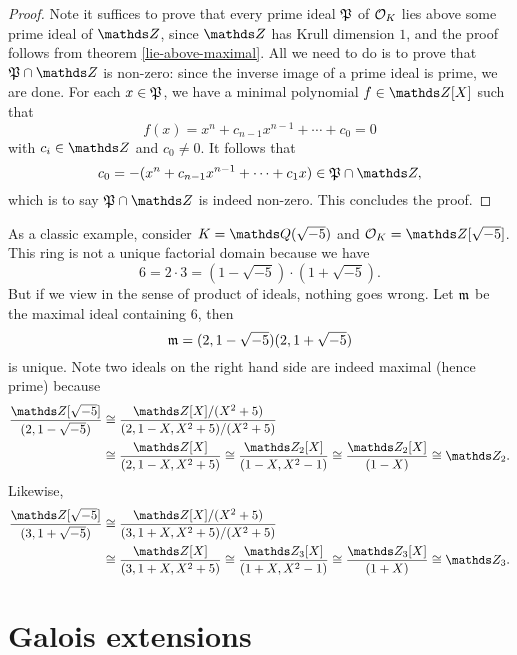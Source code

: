 			\begin{proof}
				Note it suffices to prove that every prime ideal $\mathfrak{P}$ of $\mathcal{O}_K$ lies above some prime ideal of $\Z$, since $\Z$ has Krull dimension $1$, and the proof follows from theorem \ref{lie-above-maximal}. All we need to do is to prove that $\mfk{P} \cap \Z$ is non-zero: since the inverse image of a prime ideal is prime, we are done. For each $x \in \mathfrak{P}$, we have a minimal polynomial $f \in \Z[X]$ such that
				\[
				f(x) = x^n+c_{n-1}x^{n-1}+\cdots+c_0=0
				\]
				with $c_i \in \Z$ and $c_0 \ne 0$. It follows that
				\[
				c_0=-(x^n+c_{n-1}x^{n-1}+\cdots+c_1x) \in \mfk{P} \cap \Z,
				\]
				which is to say $\mfk{P} \cap \Z$ is indeed non-zero. This concludes the proof.
			\end{proof}
			\begin{example}
				As a classic example, consider $K=\Q(\sqrt{-5})$ and $\OK = \Z[\sqrt{-5}]$. This ring is not a unique factorial domain because we have
				\[
				6 = 2 \cdot 3 = (1-\sqrt{-5}) \cdot (1+\sqrt{-5}).
				\]
				But if we view in the sense of product of ideals, nothing goes wrong. Let $\mathfrak{m}$ be the maximal ideal containing $6$, then
				\[
				\mathfrak{m} = (2,1-\sqrt{-5})(2,1+\sqrt{-5})
				\]
				is unique. Note two ideals on the right hand side are indeed maximal (hence prime) because
				\[
				\begin{aligned}
					\frac{\Z[\sqrt{-5}]}{(2,1-\sqrt{-5})} &\cong \frac{\Z[X]/(X^2+5)}{(2,1-X,X^2+5)/(X^2+5)} \\
					&\cong \frac{\Z[X]}{(2,1-X,X^2+5)} \cong \frac{\Z_2[X]}{(1-X,X^2-1)} \cong \frac{\Z_2[X]}{(1-X)} \cong \Z_2.
				\end{aligned}
				\]
				Likewise,
				\[
				\begin{aligned}
					\frac{\Z[\sqrt{-5}]}{(3,1+\sqrt{-5})} &\cong \frac{\Z[X]/(X^2+5)}{(3,1+X,X^2+5)/(X^2+5)} \\
					&\cong \frac{\Z[X]}{(3,1+X,X^2+5)} \cong \frac{\Z_3[X]}{(1+X,X^2-1)} \cong \frac{\Z_3[X]}{(1+X)} \cong \Z_3.
				\end{aligned}
				\]
			\end{example}
	\section{Galois extensions}
